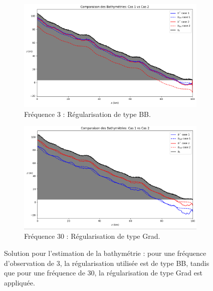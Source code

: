 \documentclass{article}
\begin{document}
\medskip
\begin{figure}[H]
    \centering
    \begin{subfigure}[b]{0.48\textwidth}
        \centering
        \includegraphics[width=\linewidth]{Images_Ayoub/Test_Cases_Tasks/Unmonitored/3/Pasted image.png}
        \caption{Fréquence 3 : Régularisation de type BB.}
        \label{fig:freq3_bb}
    \end{subfigure}
    \hfill
    \begin{subfigure}[b]{0.48\textwidth}
        \centering
        \includegraphics[width=\linewidth]{Images_Ayoub/Test_Cases_Tasks/Unmonitored/30/Pasted image.png}
        \caption{Fréquence 30 : Régularisation de type Grad.}
        \label{fig:freq30_grad}
    \end{subfigure}
    \caption{Solution pour l'estimation de la bathymétrie : pour une fréquence d'observation de 3, la régularisation utilisée est de type BB, tandis que pour une fréquence de 30, la régularisation de type Grad est appliquée.}
    \label{fig:comp_regul}
\end{figure}
\end{document}

